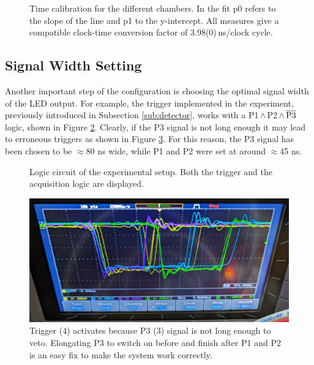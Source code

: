 \documentclass[../main.tex]{subfiles}
\begin{document}
\begin{figure}[htb!]
 \caption[Time calibration]{Time calibration for the different chambers. In the fit p0 refers to the slope of the line and p1 to the y-intercept. All measures give a compatible clock-time conversion factor of \textnormal{3.98(0)}\,\si{\nano \second}\textnormal{/clock cycle}.}%
 \label{fig:timeCalibration}%
\end{figure}

\subsection{Signal Width Setting}
Another important step of the configuration is choosing the optimal signal width of the LED output. For example, the trigger implemented in the experiment, previously introduced in Subsection \ref{sub:detector}, works with a P1\,$\land$\,P2\,$\land$\,$\overline{\textnormal{P3}}$ logic, shown in Figure \ref{fig:TriggerLogic}. Clearly, if the P3 signal is not long enough it may lead to erroneous triggers as shown in Figure \ref{fig:wrongTrigger}. For this reason, the P3 signal has been chosen to be $\approx$80 ns wide,  while P1 and P2 were set at around $\approx$45 ns.

\begin{figure}[hbt!]
   \centering
    
    \caption{Logic circuit of the experimental setup. Both the trigger and the acquisition logic are displayed.}
    \label{fig:TriggerLogic}
\end{figure}

\begin{figure}[htb!]
    \centering
    \includegraphics[width=0.8 \linewidth]{images/wrongtrigger.jpg}
    \caption{Trigger (4) activates because P3 (3) signal is not long enough to veto. Elongating P3 to switch on before and finish after P1 and P2 is an easy fix to make the system work correctly.}
    \label{fig:wrongTrigger}
\end{figure}

\end{document}
